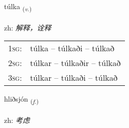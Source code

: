 \documentclass[frontgrid, backgrid]{flacards}\usepackage[]{graphicx}\usepackage[]{color}
\begin{document}
\renewcommand{\flhead}{\vskip5pt \fboxsep=0pt {\small\bfseries\footnotesize Sagnorð | 动词}}
\renewcommand{\fcfoot}{\vskip5pt \fboxsep=0pt \hspace{2pt}{\small\bfseries\footnotesize 2K}}

\renewcommand{\blhead}{\vskip5pt {\small\bfseries\footnotesize Sagnorð | 动词 }}
\renewcommand{\bcfoot}{\vskip5pt \hspace{2pt}{\small\bfseries\footnotesize 2K}}


{túlka \small{\textsubscript{(\textit{v.})}} \\[1ex] %
\textphonetic{[tʰul̥ka]} \\
zh: \emph{解释，诠释} \\  [2ex]
\renewcommand*{\arraystretch}{0.8}
\begin{tabular}{p{1cm}l}
\textsc{1sg}: & túlka -- túlkaði -- túlkað \\ 
\textsc{2sg}: & túlkar -- túlkaðir -- túlkað \\ 
\textsc{3sg}: & túlkar -- túlkaði -- túlkað \\ 
\end{tabular}
}

\renewcommand{\flhead}{\vskip5pt \fboxsep=0pt {\small\bfseries\footnotesize Nafnorð | 名词}}
\renewcommand{\fcfoot}{\vskip5pt \fboxsep=0pt \hspace{2pt}{\small\bfseries\footnotesize 2K}}

\renewcommand{\blhead}{\vskip5pt {\small\bfseries\footnotesize Nafnorð | 名词 }}
\renewcommand{\bcfoot}{\vskip5pt \hspace{2pt}{\small\bfseries\footnotesize 2K}}


{hliðsjón \small{\textsubscript{(\textit{f.})}} \\[1ex] %
\textphonetic{[l̥ɪðsjoun]} \\
zh: \emph{考虑} \\  [2ex]
\renewcommand*{\arraystretch}{0.8}
}
\end{document}
